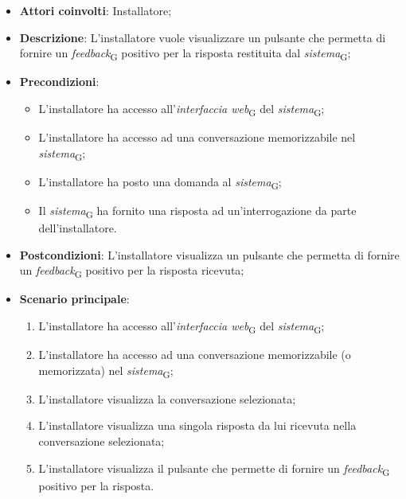\begin{itemize}
    \item \textbf{Attori coinvolti}: Installatore;
    \item \textbf{Descrizione}: L'installatore vuole visualizzare un pulsante che permetta di fornire un \textit{feedback}\textsubscript{G} positivo per la risposta restituita dal \textit{sistema}\textsubscript{G};
    \item \textbf{Precondizioni}: 
    \begin{itemize}
        \item L’installatore ha accesso all’\textit{interfaccia web}\textsubscript{G} del \textit{sistema}\textsubscript{G};
        \item L’installatore ha accesso ad una conversazione memorizzabile nel \textit{sistema}\textsubscript{G};
        \item L'installatore ha posto una domanda al \textit{sistema}\textsubscript{G};
        \item Il \textit{sistema}\textsubscript{G} ha fornito una risposta ad un’interrogazione da parte dell’installatore.
    \end{itemize}
    \item \textbf{Postcondizioni}: L'installatore visualizza un pulsante che permetta di fornire un \textit{feedback}\textsubscript{G} positivo per la risposta ricevuta;
    \item \textbf{Scenario principale}:
    \begin{enumerate}
        \item L’installatore ha accesso all’\textit{interfaccia web}\textsubscript{G} del \textit{sistema}\textsubscript{G};
        \item L’installatore ha accesso ad una conversazione memorizzabile (o memorizzata) nel \textit{sistema}\textsubscript{G};
        \item L'installatore visualizza la conversazione selezionata;
        \item L'installatore visualizza una singola risposta da lui ricevuta nella conversazione selezionata;
        \item L'installatore visualizza il pulsante che permette di fornire un \textit{feedback}\textsubscript{G} positivo per la risposta.
    \end{enumerate}
\end{itemize}

